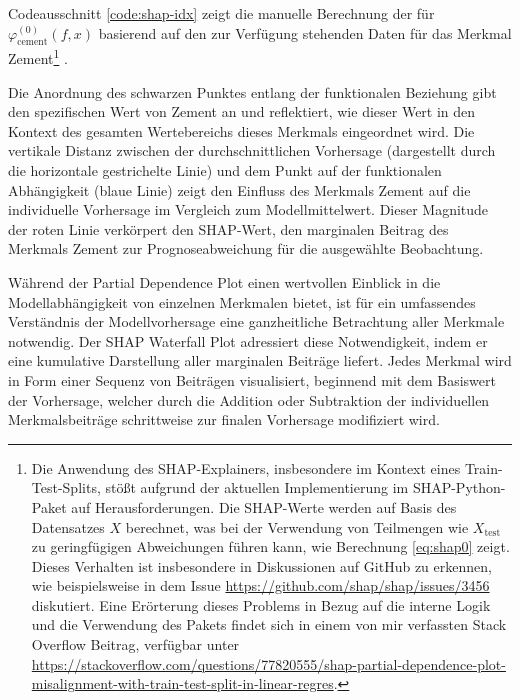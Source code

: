 Codeausschnitt \ref{code:shap-idx} zeigt die manuelle Berechnung der für $\varphi_{\text{cement}}^{(0)}(f, x)$ basierend
auf den zur Verfügung stehenden Daten für das Merkmal Zement\footnote{Die Anwendung des SHAP-Explainers, 
insbesondere im Kontext eines Train-Test-Splits, stößt aufgrund der aktuellen Implementierung im SHAP-Python-Paket 
auf Herausforderungen. Die SHAP-Werte werden auf Basis des Datensatzes $X$ berechnet, 
was bei der Verwendung von Teilmengen wie $X_{\text{test}}$ zu geringfügigen Abweichungen führen kann, wie Berechnung \ref{eq:shap0} zeigt.
Dieses Verhalten ist insbesondere in Diskussionen auf GitHub zu erkennen, wie beispielsweise in dem Issue 
\url{https://github.com/shap/shap/issues/3456} diskutiert. Eine Erörterung dieses Problems in Bezug auf die interne Logik und die Verwendung des Pakets
findet sich in einem von mir verfassten Stack Overflow Beitrag, verfügbar unter 
\url{https://stackoverflow.com/questions/77820555/shap-partial-dependence-plot-misalignment-with-train-test-split-in-linear-regres}.}
.



Die Anordnung des schwarzen Punktes entlang der funktionalen Beziehung gibt den spezifischen Wert 
von Zement an und reflektiert, wie dieser Wert in den Kontext des gesamten Wertebereichs dieses Merkmals 
eingeordnet wird. Die vertikale Distanz zwischen der durchschnittlichen Vorhersage (dargestellt durch die horizontale 
gestrichelte Linie) und dem Punkt auf der funktionalen Abhängigkeit (blaue Linie) zeigt den Einfluss des Merkmals 
Zement auf die individuelle Vorhersage im Vergleich zum Modellmittelwert. Dieser Magnitude der roten Linie verkörpert den SHAP-Wert,
den marginalen Beitrag des Merkmals Zement zur Prognoseabweichung für die ausgewählte Beobachtung.

Während der Partial Dependence Plot einen wertvollen Einblick in die Modellabhängigkeit von 
einzelnen Merkmalen bietet, ist für ein umfassendes Verständnis der Modellvorhersage eine ganzheitliche 
Betrachtung aller Merkmale notwendig. Der SHAP Waterfall Plot adressiert diese Notwendigkeit, 
indem er eine kumulative Darstellung aller marginalen Beiträge liefert. Jedes Merkmal wird in 
Form einer Sequenz von Beiträgen visualisiert, beginnend mit dem Basiswert der Vorhersage, welcher 
durch die Addition oder Subtraktion der individuellen Merkmalsbeiträge schrittweise zur finalen Vorhersage 
modifiziert wird.

